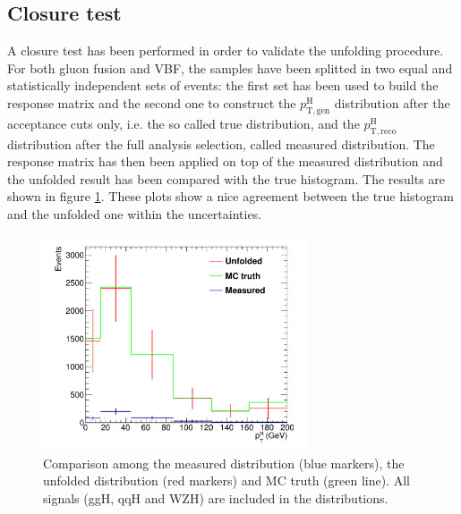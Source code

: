 \subsection{Closure test}\label{subsec:unfolding_closure}

A closure test has been performed in order to validate the unfolding procedure. For both gluon fusion and VBF, the samples have been splitted in two equal and statistically independent sets of events: the first set has been used to build the response matrix and the second one to construct the $p_\mathrm{T,gen}^\mathrm{H}$ distribution after the acceptance cuts only, i.e. the so called true distribution, and the $p_\mathrm{T,reco}^\mathrm{H}$ distribution after the full analysis selection, called measured distribution. The response matrix has then been applied on top of the measured distribution and the unfolded result has been compared with the true histogram. The results are shown in figure \ref{fig:unfold_test}. These plots show a nice agreement between the true histogram and the unfolded one within the uncertainties.
\begin{figure}[htb]
\centering
\includegraphics[width=0.7\textwidth]{images/closure_fakes.pdf}
\caption{Comparison among the measured distribution (blue markers), the unfolded distribution (red markers) and MC truth (green line). All signals (ggH, qqH and WZH) are included in the distributions.}
\label{fig:unfold_test}
\end{figure}

